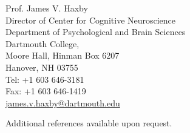 \documentclass[12pt,overlapped,line]{res}
\begin{document}
\begin{resume}
{\small
Prof. James V. Haxby \\
Director of Center for Cognitive Neuroscience \\
Department of Psychological and Brain Sciences \\
Dartmouth College, \\
Moore Hall, Hinman Box 6207 \\
Hanover, NH 03755 \\
Tel: +1 603 646-3181 \\
Fax: +1 603 646-1419 \\
\url{james.v.haxby@dartmouth.edu} \\
}

Additional references available upon request.



\end{resume}
\end{document}
